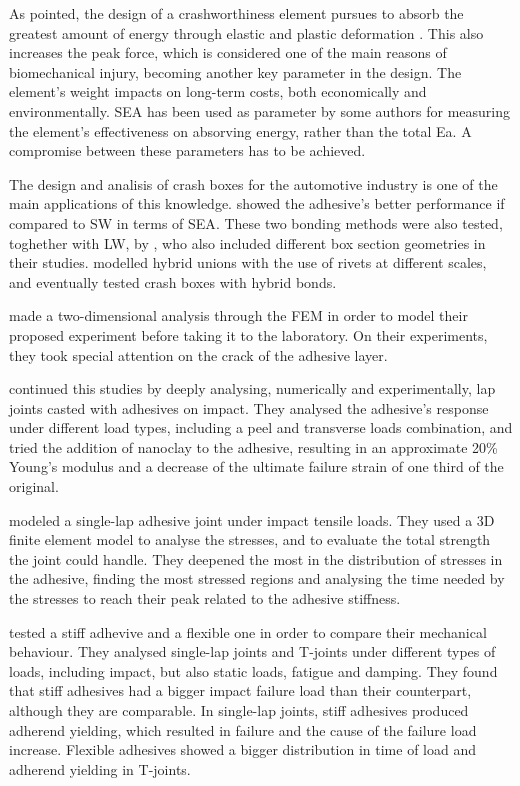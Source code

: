 As \citet{Hou2008} pointed, the design of a crashworthiness element pursues to absorb the greatest amount of energy through elastic and plastic deformation \citep{Wu2006}. This also increases the peak force, which is considered one of the main reasons of biomechanical injury, becoming another key parameter in the design. The element's weight impacts on long-term costs, both economically and environmentally. \Gls{SEA} has been used as parameter by some authors \citep{Lee2006, Peroni2009, Scattina2011} for measuring the element's effectiveness on absorving energy, rather than the total \gls{Ea}. A compromise between these parameters has to be achieved.

The design and analisis of crash boxes for the automotive industry is one of the main applications of this knowledge. \citet{Lee2006} showed the adhesive's better performance if compared to \gls{SW} in terms of \gls{SEA}. These two bonding methods were also tested, toghether with \gls{LW}, by \citet{Peroni2009}, who also included different box section geometries in their studies. \citet{Sadowski2010, Sadowski2011} modelled hybrid unions with the use of rivets at different scales, and eventually tested crash boxes with hybrid bonds.


\citet{Kihara2003} made a two-dimensional analysis through the FEM in order to model their proposed experiment before taking it to the laboratory. On their experiments, they took special attention on the crack of the adhesive layer.

\citet{Vaidya2006} continued this studies by deeply analysing, numerically and experimentally, lap joints casted with adhesives on impact. They analysed the adhesive's response under different load types, including a peel and transverse loads combination, and tried the addition of nanoclay to the adhesive, resulting in an approximate 20\% Young's modulus and a decrease of the ultimate failure strain of one third of the original.

\citet{Liao2011} modeled a single-lap adhesive joint under impact tensile loads. They used a 3D finite element model to analyse the stresses, and to evaluate the total strength the joint could handle. They deepened the most in the distribution of stresses in the adhesive, finding the most stressed regions and analysing the time needed by the stresses to reach their peak related to the adhesive stiffness.

\citet{Loureiro2010} tested a stiff adhevive and a flexible one in order to compare their mechanical behaviour. They analysed single-lap joints and T-joints under different types of loads, including impact, but also static loads, fatigue and damping. They found that stiff adhesives had a bigger impact failure load than their counterpart, although they are comparable. In single-lap joints, stiff adhesives produced adherend yielding, which resulted in failure and the cause of the failure load increase. Flexible adhesives showed a bigger distribution in time of load and adherend yielding in T-joints.


